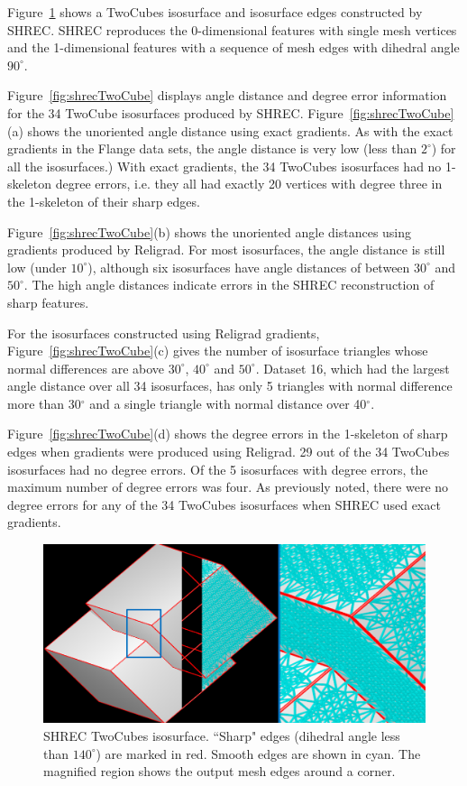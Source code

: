 Figure~\ref{fig:shrecPerfect1} shows a TwoCubes isosurface
and isosurface edges constructed by SHREC.
SHREC reproduces the 0-dimensional features with single mesh vertices
and the 1-dimensional features with a sequence of mesh edges
with dihedral angle $90^\circ$.

Figure~\ref{fig:shrecTwoCube} displays angle distance and degree error
information for the 34 TwoCube isosurfaces produced by SHREC.
Figure~\ref{fig:shrecTwoCube}(a) shows the unoriented angle distance
using exact gradients.
As with the exact gradients in the Flange data sets,
the angle distance is very low (less than $2^\circ$)
for all the isosurfaces.)
With exact gradients, the 34 TwoCubes isosurfaces 
had no 1-skeleton degree errors, 
i.e. they all had exactly 20 vertices with degree three 
in the 1-skeleton of their sharp edges.

Figure~\ref{fig:shrecTwoCube}(b) shows the unoriented angle distances
using gradients produced by Religrad.
For most isosurfaces, the angle distance is still low (under $10^\circ$),
although six isosurfaces have angle distances of between $30^\circ$
and $50^\circ$.
The high angle distances indicate errors in the SHREC reconstruction 
of sharp features.

For the isosurfaces constructed using Religrad gradients,
Figure~\ref{fig:shrecTwoCube}(c) gives
the number of isosurface triangles whose normal differences
are above $30^\circ$, $40^\circ$ and $50^\circ$.
Dataset 16, which had the largest angle distance over all 34 isosurfaces,
has only 5 triangles with normal difference more than 30$^\circ$ 
and a single triangle with normal distance over 40$^\circ$.  

Figure~\ref{fig:shrecTwoCube}(d) shows
the degree errors in the 1-skeleton of sharp edges
when gradients were produced using Religrad.
29 out of the 34 TwoCubes isosurfaces had no degree errors.
Of the 5 isosurfaces with degree errors,
the maximum number of degree errors was four.
As previously noted,
there were no degree errors for any of the 34 TwoCubes isosurfaces
when SHREC used exact gradients.

\begin{figure}[t]
	\includegraphics[width=\linewidth]{images/shrecPerfect.eps}
	\caption{SHREC TwoCubes isosurface. 
``Sharp" edges (dihedral angle less than $140^\circ$) are marked in red. 
Smooth edges are shown in cyan. The magnified region shows the output mesh edges around a corner.}
	\label{fig:shrecPerfect1}
\end{figure}

